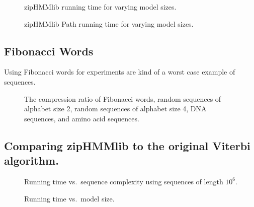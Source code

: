\begin{figure}[H]
  \centering
  
  \caption{zipHMMlib running time for varying model sizes.}
  \label{fig:assymptotic_viterbi_k}
\end{figure}

\begin{figure}[H]
  \centering
  
  \caption{zipHMMlib Path running time for varying model sizes.}
  \label{fig:assymptotic_viterbi_path_k}
\end{figure}

%   

\subsection{Fibonacci Words}
\label{sec:fibonacci-words}

Using Fibonacci words for experiments are kind of a worst case example of
sequences.

\begin{figure}[H]
  \centering {}
  
  \caption{The compression ratio of Fibonacci words, random sequences of
    alphabet size 2, random sequences of alphabet size 4, DNA
    sequences, and amino acid sequences.}
  \label{fig:compression_ratio}
\end{figure}

\subsection{Comparing zipHMMlib to the original Viterbi algorithm.}
\label{sec:comp-ziphmml-orig}

\begin{figure}[H]
  \centering
  
  \caption{Running time vs.\ sequence complexity using sequences of length $10^6$.}
  \label{fig:speedup_vs_complexity}
\end{figure}

\begin{figure}[H]
  \centering
  
  \caption{Running time vs.\ model size.}
  \label{fig:speedup_vs_k}
\end{figure}

